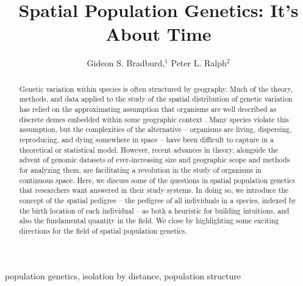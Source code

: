 \documentclass{ar-1col}
\newcommand{\g}[1]{{\color{blue}{#1}}}
\newcommand{\todo}[1]{{\textbf{\color{red}{#1}}}}
\begin{document}

\title{Spatial Population Genetics: It's About Time}


\author{Gideon S. Bradburd,$^1$ Peter L. Ralph$^2$
}

\begin{abstract}
\todo{read through and edit}

Genetic variation within species is often structured by geography.
Much of the theory, methods, and data applied to the study 
of the spatial distribution of genetic variation 
has relied on the approximating assumption that 
organisms are well described as discrete demes  
embedded within some geographic context 
\g{, like blueberries in a blueberry muffin}.
Many species violate this assumption, 
but the complexities of the alternative -- 
organisms are living, dispersing, reproducing, and dying 
somewhere in space -- 
have been difficult to capture in a theoretical or statistical model.
However, recent advances in theory, 
alongside the advent of genomic datasets 
of ever-increasing size and geographic scope 
and methods for analyzing them,
are facilitating a revolution in the study of organisms in continuous space.
Here, we discuss some of the questions in spatial population genetics 
that researchers want answered in their study systems.
In doing so, we introduce the concept of the spatial pedigree -- 
the pedigree of all individuals in a species, 
indexed by the birth location of each individual
--
as both a heuristic for building intuitions, 
and also the fundamental quantity in the field.
We close by highlighting some exciting directions 
for the field of spatial population genetics.
\end{abstract}

\begin{keywords}
population genetics, isolation by distance, population structure
\end{keywords}
\maketitle
\end{document}
